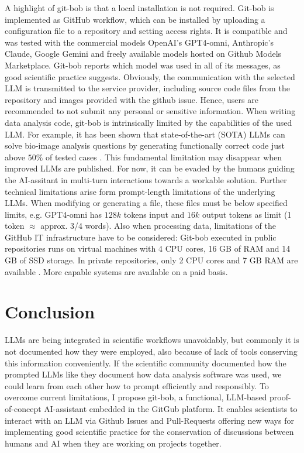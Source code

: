 \documentclass[times, twoside]{zHenriquesLab-StyleBioRxiv}
\begin{document}
A highlight of git-bob is that a local installation is not required. Git-bob is implemented as GitHub workflow, which can be installed by uploading a configuration file to a repository and setting access rights. It is compatible and was tested with the commercial models OpenAI's GPT4-omni, Anthropic's Claude, Google Gemini and freely available models hosted on Github Models Marketplace. Git-bob reports which model was used in all of its messages, as good scientific practice suggests. Obviously, the communication with the selected LLM is transmitted to the service provider, including source code files from the repository and images provided with the github issue. Hence, users are recommended to not submit any personal or sensitive information. When writing data analysis code, git-bob is intrinsically limited by the capabilities of the used LLM. For example, it has been shown that state-of-the-art (SOTA) LLMs can solve bio-image analysis questions by generating functionally correct code just above $50\%$ of tested cases \cite{benchmark_llm_bia}. This fundamental limitation may disappear when improved LLMs are published. For now, it can be evaded by the humans guiding the AI-assitant in multi-turn interactions towards a workable solution. Further technical limitations arise form prompt-length limitations of the underlying LLMs. When modifying or generating a file, these files must be below specified limits, e.g. GPT4-omni has $128k$ tokens input and $16k$ output tokens as limit (1 token $\approx$ approx. 3/4 words). Also when processing data, limitations of the GitHub IT infrastructure have to be considered: Git-bob executed in public repositories runs on virtual machines with 4 CPU cores, 16 GB of RAM and 14 GB of SSD storage. In private repositories, only 2 CPU cores and 7 GB RAM are available \cite{github_actions_runners_2024}. More capable systems are available on a paid basis. 


\section*{Conclusion}

LLMs are being integrated in scientific workflows unavoidably, but commonly it is not documented how they were employed, also because of lack of tools conserving this information conveniently. If the scientific community documented how the prompted LLMs like they document how data analysis software was used, we could learn from each other how to prompt efficiently and responsibly. To overcome current limitations, I propose git-bob, a functional, LLM-based proof-of-concept AI-assistant embedded in the GitGub platform. It enables scientists to interact with an LLM via Github Issues and Pull-Requests offering new ways for implementing good scientific practice for the conservation of discussions between humans and AI when they are working on projects together.
\end{document}
